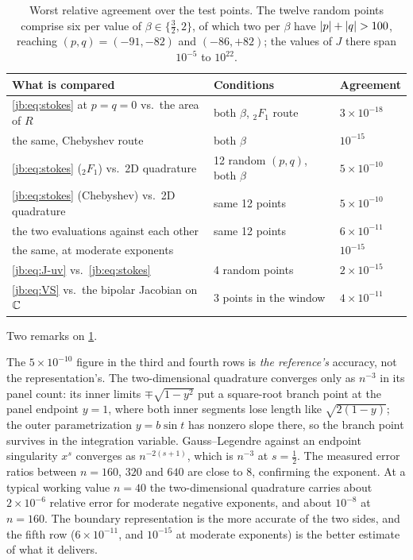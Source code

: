 \begin{table}[htp]
  \centering
  \begin{tabular}{lll}
    \toprule
    What is compared & Conditions & Agreement \\
    \midrule
    \eqref{jb:eq:stokes} at $p = q = 0$ vs.\ the area of $R$ & both $\beta$, ${}_2F_1$ route & $3 \times 10^{-18}$ \\
    the same, Chebyshev route & both $\beta$ & $10^{-15}$ \\
    \eqref{jb:eq:stokes} (${}_2F_1$) vs.\ 2D quadrature & 12 random $(p,q)$, both $\beta$ & $5 \times 10^{-10}$ \\
    \eqref{jb:eq:stokes} (Chebyshev) vs.\ 2D quadrature & same 12 points & $5 \times 10^{-10}$ \\
    the two evaluations against each other & same 12 points & $6 \times 10^{-11}$ \\
    the same, at moderate exponents & & $10^{-15}$ \\
    \eqref{jb:eq:J-uv} vs.\ \eqref{jb:eq:stokes} & 4 random points & $2 \times 10^{-15}$ \\
    \eqref{jb:eq:VS} vs.\ the bipolar Jacobian on $\mathbb{C}$ & 3 points in the window & $4 \times 10^{-11}$ \\
    \bottomrule
  \end{tabular}
  \caption{
    Worst relative agreement over the test points.
    The twelve random points comprise six per value of $\beta \in \{ \tfrac32, 2 \}$, of which two
    per $\beta$ have ${|p|} + {|q|} > 100$, reaching $(p, q) = (-91, -82)$ and $(-86, +82)$;
    the values of $J$ there span $10^{-5}$ to $10^{22}$.
  }
  \label{jb:tab:accuracy}
\end{table}

Two remarks on \cref{jb:tab:accuracy}.

The $5 \times 10^{-10}$ figure in the third and fourth rows is \emph{the reference's} accuracy, not
the representation's.
The two-dimensional quadrature converges only as $n^{-3}$ in its panel count: its inner limits
$\mp \sqrt{1 - y^2}$ put a square-root branch point at the panel endpoint $y = 1$, where both inner
segments lose length like $\sqrt{2(1-y)}$; the outer parametrization $y = b \sin t$ has nonzero
slope there, so the branch point survives in the integration variable.
Gauss--Legendre against an endpoint singularity $x^{s}$ converges as $n^{-2(s+1)}$, which is
$n^{-3}$ at $s = \tfrac12$.
The measured error ratios between $n = 160$, $320$ and $640$ are close to $8$, confirming the
exponent.
At a typical working value $n = 40$ the two-dimensional quadrature carries about $2 \times 10^{-6}$
relative error for moderate negative exponents, and about $10^{-8}$ at $n = 160$.
The boundary representation is the more accurate of the two sides, and the fifth row
($6 \times 10^{-11}$, and $10^{-15}$ at moderate exponents) is the better estimate of what it
delivers.

